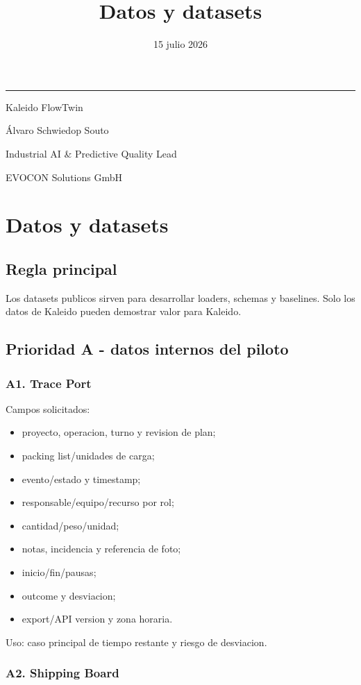 \documentclass[
  spanish,
  10pt,
  a4paper,
]{article}
\title{Datos y datasets}
\author{}
\date{15 julio 2026}
\makeatletter
\providecommand{\tightlist}{%
  \setlength{\itemsep}{0pt}\setlength{\parskip}{0pt}}
\renewcommand{\maketitle}{%
  \hypersetup{pageanchor=false}
  \begin{titlepage}
    \pagecolor{KaleidoNavy}
    \color{white}
    \vspace*{1.4cm}
    {\color{KaleidoCyan}\rule{2.4cm}{2.5pt}\par}
    \vspace{1.1cm}
    {\Huge\bfseries\@title\par}
    \vspace{0.65cm}
    {\Large\color{KaleidoMint}Kaleido FlowTwin\par}
    \vfill
    {\large Álvaro Schwiedop Souto\par}
    \vspace{0.15cm}
    {\normalsize\color{KaleidoMint}Industrial AI \& Predictive Quality Lead\par}
    \vspace{0.15cm}
    {\normalsize\color{KaleidoMint}EVOCON Solutions GmbH\par}
    \vspace{0.25cm}
    {\normalsize\color{KaleidoMint}\@date\par}
  \end{titlepage}
  \hypersetup{pageanchor=true}
  \nopagecolor
  \color{black}
}
\makeatother
\begin{document}
\maketitle

{
\setcounter{tocdepth}{3}
\tableofcontents
}
\section{Datos y datasets}\label{datos-y-datasets}

\subsection{Regla principal}\label{regla-principal}

Los datasets publicos sirven para desarrollar loaders, schemas y
baselines. Solo los datos de Kaleido pueden demostrar valor para
Kaleido.

\subsection{Prioridad A - datos internos del
piloto}\label{prioridad-a---datos-internos-del-piloto}

\subsubsection{A1. Trace Port}\label{a1-trace-port}

Campos solicitados:

\begin{itemize}
\tightlist
\item
  proyecto, operacion, turno y revision de plan;
\item
  packing list/unidades de carga;
\item
  evento/estado y timestamp;
\item
  responsable/equipo/recurso por rol;
\item
  cantidad/peso/unidad;
\item
  notas, incidencia y referencia de foto;
\item
  inicio/fin/pausas;
\item
  outcome y desviacion;
\item
  export/API version y zona horaria.
\end{itemize}

Uso: caso principal de tiempo restante y riesgo de desviacion.

\subsubsection{A2. Shipping Board}\label{a2-shipping-board}
\end{document}
